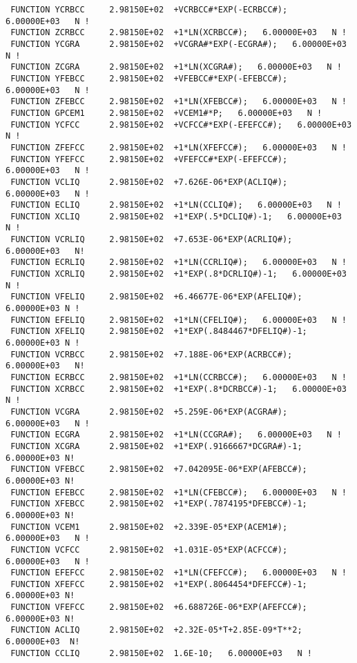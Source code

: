 \documentclass[12pt]{article}
\begin{document}
\begin{verbatim}
 FUNCTION YCRBCC     2.98150E+02  +VCRBCC#*EXP(-ECRBCC#);   6.00000E+03   N !
 FUNCTION ZCRBCC     2.98150E+02  +1*LN(XCRBCC#);   6.00000E+03   N !
 FUNCTION YCGRA      2.98150E+02  +VCGRA#*EXP(-ECGRA#);   6.00000E+03   N !
 FUNCTION ZCGRA      2.98150E+02  +1*LN(XCGRA#);   6.00000E+03   N !
 FUNCTION YFEBCC     2.98150E+02  +VFEBCC#*EXP(-EFEBCC#);   6.00000E+03   N !
 FUNCTION ZFEBCC     2.98150E+02  +1*LN(XFEBCC#);   6.00000E+03   N !
 FUNCTION GPCEM1     2.98150E+02  +VCEM1#*P;   6.00000E+03   N !
 FUNCTION YCFCC      2.98150E+02  +VCFCC#*EXP(-EFEFCC#);   6.00000E+03   N !
 FUNCTION ZFEFCC     2.98150E+02  +1*LN(XFEFCC#);   6.00000E+03   N !
 FUNCTION YFEFCC     2.98150E+02  +VFEFCC#*EXP(-EFEFCC#);   6.00000E+03   N !
 FUNCTION VCLIQ      2.98150E+02  +7.626E-06*EXP(ACLIQ#);   6.00000E+03   N !
 FUNCTION ECLIQ      2.98150E+02  +1*LN(CCLIQ#);   6.00000E+03   N !
 FUNCTION XCLIQ      2.98150E+02  +1*EXP(.5*DCLIQ#)-1;   6.00000E+03   N !
 FUNCTION VCRLIQ     2.98150E+02  +7.653E-06*EXP(ACRLIQ#);   6.00000E+03   N!
 FUNCTION ECRLIQ     2.98150E+02  +1*LN(CCRLIQ#);   6.00000E+03   N !
 FUNCTION XCRLIQ     2.98150E+02  +1*EXP(.8*DCRLIQ#)-1;   6.00000E+03   N !
 FUNCTION VFELIQ     2.98150E+02  +6.46677E-06*EXP(AFELIQ#);   6.00000E+03 N !
 FUNCTION EFELIQ     2.98150E+02  +1*LN(CFELIQ#);   6.00000E+03   N !
 FUNCTION XFELIQ     2.98150E+02  +1*EXP(.8484467*DFELIQ#)-1;   6.00000E+03 N !
 FUNCTION VCRBCC     2.98150E+02  +7.188E-06*EXP(ACRBCC#);   6.00000E+03   N!
 FUNCTION ECRBCC     2.98150E+02  +1*LN(CCRBCC#);   6.00000E+03   N !
 FUNCTION XCRBCC     2.98150E+02  +1*EXP(.8*DCRBCC#)-1;   6.00000E+03   N !
 FUNCTION VCGRA      2.98150E+02  +5.259E-06*EXP(ACGRA#);   6.00000E+03   N !
 FUNCTION ECGRA      2.98150E+02  +1*LN(CCGRA#);   6.00000E+03   N !
 FUNCTION XCGRA      2.98150E+02  +1*EXP(.9166667*DCGRA#)-1;   6.00000E+03 N!
 FUNCTION VFEBCC     2.98150E+02  +7.042095E-06*EXP(AFEBCC#);   6.00000E+03 N!
 FUNCTION EFEBCC     2.98150E+02  +1*LN(CFEBCC#);   6.00000E+03   N !
 FUNCTION XFEBCC     2.98150E+02  +1*EXP(.7874195*DFEBCC#)-1;   6.00000E+03 N!
 FUNCTION VCEM1      2.98150E+02  +2.339E-05*EXP(ACEM1#);   6.00000E+03   N !
 FUNCTION VCFCC      2.98150E+02  +1.031E-05*EXP(ACFCC#);   6.00000E+03   N !
 FUNCTION EFEFCC     2.98150E+02  +1*LN(CFEFCC#);   6.00000E+03   N !
 FUNCTION XFEFCC     2.98150E+02  +1*EXP(.8064454*DFEFCC#)-1;   6.00000E+03 N!
 FUNCTION VFEFCC     2.98150E+02  +6.688726E-06*EXP(AFEFCC#);   6.00000E+03 N!
 FUNCTION ACLIQ      2.98150E+02  +2.32E-05*T+2.85E-09*T**2;   6.00000E+03  N!
 FUNCTION CCLIQ      2.98150E+02  1.6E-10;   6.00000E+03   N !

\end{verbatim}
\end{document}
